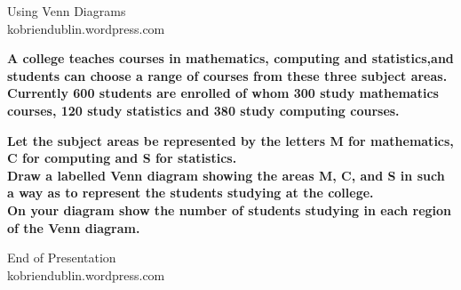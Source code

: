 \documentclass[a4]{beamer}
\begin{document}
\begin{frame}
\vspace{1.4cm}
{\Huge Using Venn Diagrams }\\ \bigskip
{\Large kobriendublin.wordpress.com}
\end{frame}
\begin{frame}
\textbf{A college teaches courses in mathematics, computing and statistics,and students can choose a range of courses from these three subject areas. \\
\bigskip
Currently 600 students are enrolled of whom 300 study mathematics courses, 120 study statistics
and 380 study computing courses. }

\end{frame}
\begin{frame}

\textbf{Let the subject areas be represented by the letters M for mathematics, C for computing and S for statistics. 
\\
\bigskip
Draw a labelled Venn diagram showing the areas M, C, and S in such a way as to represent the students studying at
the college. 
\\
\bigskip
On your diagram show the number of students studying in each region of the Venn diagram.
}
\end{frame}

\begin{frame}
\vspace{1.4cm}
{\Huge End of Presentation }\\ \bigskip
{\Large kobriendublin.wordpress.com}
\end{frame}
\end{document}
